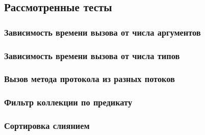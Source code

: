 \subsection{Рассмотренные тесты}

\subsubsection{Зависимость времени вызова от числа аргументов}

\subsubsection{Зависимость времени вызова от числа типов}

\subsubsection{Вызов метода протокола из разных потоков}

\subsubsection{Фильтр коллекции по предикату}

\subsubsection{Сортировка слиянием}
